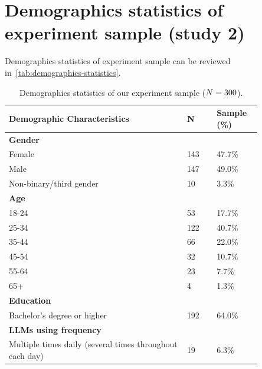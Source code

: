 \appendix

\section{Demographics statistics of experiment sample (study 2)}
\label{sec: appendix-experiment-sample}
Demographics statistics of experiment sample can be reviewed in~\autoref{tab:demographics-statistics}.


\begin{table}[]
    \centering
    \caption{Demographics statistics of our experiment sample ($N = 300{}$).}
    \begin{tabular}{p{0.6\linewidth} p{0.1\linewidth} p{0.15\linewidth}}
    \toprule
    Demographic Characteristics& N& Sample (\%)\\
    \midrule
    \multicolumn{3}{l}{\textbf{Gender}}\\
        \hspace{3mm} Female& 143& 47.7\%\\
        \hspace{3mm} Male& 147& 49.0\%\\
        \hspace{3mm} Non-binary/third gender& 10& 3.3\%\\
    \multicolumn{3}{l}{\textbf{Age}}\\
        \hspace{3mm} 18-24& 53& 17.7\%\\
        \hspace{3mm} 25-34& 122& 40.7\%\\\hspace{3mm} 35-44& 66& 22.0\%\\\hspace{3mm} 45-54& 32& 10.7\%\\\hspace{3mm} 55-64& 23& 7.7\%\\\hspace{3mm} 65+& 4& 1.3\%\\
    \multicolumn{3}{l}{\textbf{Education}}\\
        \hspace{3mm} Bachelor’s degree or higher& 192& 64.0\%\\
    \multicolumn{3}{l}{\textbf{LLMs using frequency}}\\
        \hspace{3mm} Multiple times daily (several times throughout each day)& 19& 6.3\%\\

\end{tabular}
\end{table}
